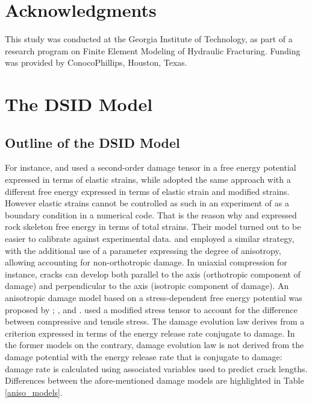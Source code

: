 \documentclass[preprint,review,12pt]{elsarticle}
\begin{document}
\section*{Acknowledgments}
This study was conducted at the Georgia Institute of Technology, as part of a research program on Finite Element Modeling of Hydraulic Fracturing. Funding was provided by ConocoPhillips, Houston, Texas.

\appendix
\section{The DSID Model}

\subsection{Outline of the DSID Model}

For instance, \cite{Abualrub2010} and \cite{Cicekli2007} used a second-order damage tensor in a free energy potential expressed in terms of elastic strains, while \cite{Murakami1996} adopted the same approach with a different free energy expressed in terms of elastic strain and modified strains. However elastic strains cannot be controlled as such in an experiment of as a boundary condition in a numerical code. That is the reason why \cite{Halm1998} and \cite{Homand-Etienne1998} expressed rock skeleton free energy in terms of total strains. Their model turned out to be easier to calibrate against experimental data. \cite{Chaboche1993} and \cite{Pellet2005} employed a similar strategy, with the additional use of a parameter expressing the degree of anisotropy, allowing accounting for non-orthotropic damage. In uniaxial compression for instance, cracks can develop both parallel to the axis (orthotropic component of damage) and perpendicular to the axis (isotropic component of damage). An anisotropic damage model based on a stress-dependent free energy potential was proposed by \cite{Shao2005}; \cite{Shao2006}, \cite{Zhou2006} and \cite{Hayakawa1997}. \cite{Hayakawa1997} used a modified stress tensor to account for the difference between compressive and tensile stress. The damage evolution law derives from a criterion expressed in terms of the energy release rate conjugate to damage. In the former models on the contrary, damage evolution law is not derived from the damage potential with the energy release rate that is conjugate to damage: damage rate is calculated using associated variables used to predict crack lengths. Differences between the afore-mentioned damage models are highlighted in Table \ref{aniso_models}.
\end{document}
